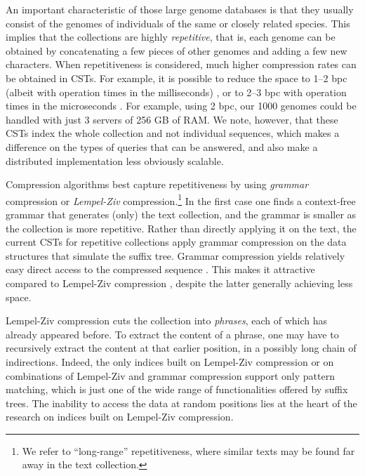 An important characteristic of those large genome databases is that they 
usually consist of the genomes of individuals of the same or closely related
species. This implies that the collections are highly {\em repetitive}, that
is, each genome can be obtained by concatenating a few pieces of other genomes
and adding a few new characters. When repetitiveness is considered, much higher
compression rates can be obtained in CSTs. For example, it is possible to reduce
the space to 1--2 bpc (albeit with operation times in the milliseconds)
\cite{Abeliuk2013}, or to 2--3 bpc with operation times in the microseconds
\cite{Navarro2014}. For example, using 2 bpc, our 1000 genomes could be handled
with just 3 servers of 256 GB of RAM. We note, however, that these CSTs index
the whole collection and not individual sequences, which makes a difference on
the types of queries that can be answered, and also make a distributed 
implementation less obviously scalable.

Compression algorithms best capture repetitiveness by using {\em grammar}
compression or {\em Lempel-Ziv} compression.\footnote{We refer to ``long-range''
repetitiveness, where similar texts may be found far away in the text
collection.} In the first case \cite{KY00,CLLPPSS05} one finds a context-free 
grammar that generates (only) the text collection, and the grammar is smaller 
as the collection is more repetitive. Rather than directly applying it on the 
text, the current CSTs for repetitive collections \cite{Abeliuk2013,Navarro2014}
apply grammar compression on the data structures that simulate the suffix tree.
Grammar compression yields relatively easy direct access to the compressed 
sequence \cite{BLRSRW15}. This makes it attractive compared to Lempel-Ziv 
compression \cite{ZL77}, despite the latter generally achieving less space.

Lempel-Ziv compression cuts the collection into {\em phrases}, each of which
has already appeared before. To extract the content of a phrase, one may have
to recursively extract the content at that earlier position, in a possibly long
chain of indirections.
Indeed, the only indices built on Lempel-Ziv compression \cite{KN13} or on
combinations of Lempel-Ziv and grammar compression \cite{GGKNP12,GGKNP14,GP15}
support only pattern matching, which is just one of the wide range of 
functionalities offered by suffix trees. The inability to access the data
at random positions lies at the heart of the research on indices built on
Lempel-Ziv compression. 

